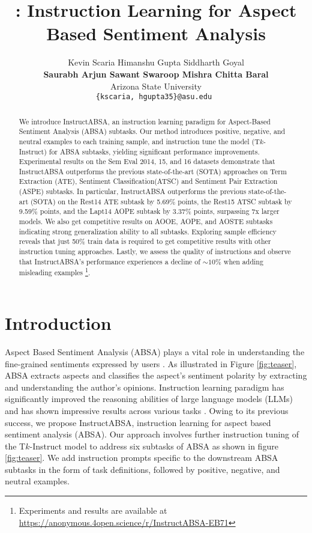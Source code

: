 \documentclass[11pt]{article}
\title{ \name{}: Instruction Learning for Aspect Based Sentiment Analysis}
\author{Kevin Scaria \hspace{9pt} Himanshu Gupta \hspace{9pt} Siddharth Goyal\hspace{9pt} \\ \textbf{Saurabh Arjun Sawant \hspace{9pt} Swaroop Mishra \hspace{9pt}Chitta Baral}\\
  Arizona State University \\
\tt\small   \texttt{\{kscaria, hgupta35\}}@asu.edu
  }
\newcommand{\name}{\textsc{I}nstruct\textsc{ABSA}\xspace}
\begin{document}
\maketitle
\begin{abstract}
We introduce \name{}, an instruction learning paradigm for Aspect-Based Sentiment Analysis (ABSA) subtasks.
Our method introduces positive, negative, and neutral examples to each training sample, and instruction tune the model (T$k$-Instruct) for ABSA subtasks, yielding significant performance improvements.
Experimental results on the Sem Eval 2014, 15, and 16 datasets demonstrate that \name{} outperforms the previous state-of-the-art (SOTA) approaches on Term Extraction (ATE), Sentiment Classification(ATSC) and Sentiment Pair Extraction (ASPE) subtasks.
In particular, \name{} outperforms the previous state-of-the-art (SOTA) on the Rest14 ATE subtask by 5.69\% points, the Rest15 ATSC subtask by 9.59\% points, and the Lapt14 AOPE subtask by 3.37\% points, surpassing 7x larger models.
We also get competitive results on AOOE, AOPE, and AOSTE subtasks indicating strong generalization ability to all subtasks. 
Exploring sample efficiency reveals that just 50\% train data is required to get competitive results with other instruction tuning approaches. 
Lastly, we assess the quality of instructions and observe that \name{}'s performance experiences a decline of $\sim10\%$ when adding misleading examples
\footnote{Experiments and results are available at 
\url{https://anonymous.4open.science/r/InstructABSA-EB71}
}.
\end{abstract}

\section{Introduction}
Aspect Based Sentiment Analysis (ABSA) plays a vital role in understanding the fine-grained sentiments expressed by users \cite{Zhang2012SentimentAA}. As illustrated in Figure \ref{fig:teaser}, ABSA extracts aspects and classifies the aspect's sentiment polarity by extracting and understanding the author's opinions. 
Instruction learning paradigm \cite{mishra-etal-2022-cross, wei2022finetuned,gupta2023instruction} has significantly improved the reasoning abilities of large language models (LLMs) and has shown impressive results across various tasks \cite{wang2022self,lu2022learn}.  
Owing to its previous success, we propose \name{}, instruction learning for aspect based sentiment analysis (ABSA).  
Our approach involves further instruction tuning of the T$k$-Instruct model \cite{wang-etal-2022-super} to address six subtasks of ABSA as shown in figure \ref{fig:teaser}. We add instruction prompts specific to the downstream ABSA subtasks in the form of task definitions, followed by positive, negative, and neutral examples.
\end{document}
